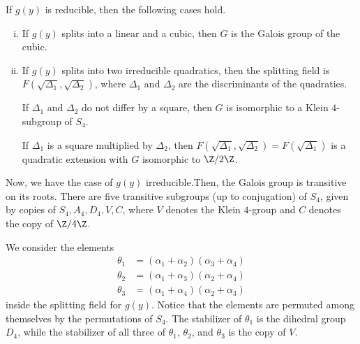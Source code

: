 \documentclass[10pt]{mypackage}
\begin{document}
If $g(y)$ is reducible, then the following cases hold.
\begin{enumerate}[(i)]
  \item If $g(y)$ splits into a linear and a cubic, then $G$ is the Galois group of the cubic.
  \item If $g(y)$ splits into two irreducible quadratics, then the splitting field is $F\left( \sqrt{\Delta_1},\sqrt{\Delta_2} \right)$, where $\Delta_1$ and $\Delta_2$ are the discriminants of the quadratics.

    If $\Delta_1$ and $\Delta_2$ do not differ by a square, then $G$ is isomorphic to a Klein $4$-subgroup of $S_4$.

    If $\Delta_1$ is a square multiplied by $\Delta_2$, then $F\left( \sqrt{\Delta_1},\sqrt{\Delta_2} \right) = F\left( \sqrt{\Delta_1} \right)$ is a quadratic extension with $G$ isomorphic to $\Z/2\Z$.
\end{enumerate}
Now, we have the case of $g(y)$ irreducible.Then, the Galois group is transitive on its roots. There are five transitive subgroups (up to conjugation) of $S_4$, given by copies of $S_4,A_4,D_4,V,C$, where $V$ denotes the Klein $4$-group and $C$ denotes the copy of $\Z/4\Z$.

We consider the elements
\begin{align*}
  \theta_1 &= \left( \alpha_1 + \alpha_2 \right)\left( \alpha_3 + \alpha_4 \right)\\
  \theta_2 &= \left( \alpha_1 + \alpha_3 \right)\left( \alpha_2 + \alpha_4 \right)\\
  \theta_3 &= \left( \alpha_1 + \alpha_4 \right)\left( \alpha_2 + \alpha_3 \right)
\end{align*}
inside the splitting field for $g(y)$. Notice that the elements are permuted among themselves by the permutations of $S_4$. The stabilizer of $\theta_1$ is the dihedral group $D_4$, while the stabilizer of all three of $\theta_1$, $\theta_2$, and $\theta_3$ is the copy of $V$.
\end{document}

